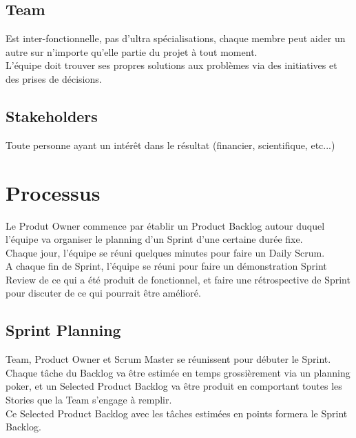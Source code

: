 \documentclass{report}
\begin{document}
		\subsection{Team}

			Est inter-fonctionnelle, pas d'ultra spécialisations, chaque membre peut aider un autre sur n'importe qu'elle partie du projet à tout moment.\\

			L'équipe doit trouver ses propres solutions aux problèmes via des initiatives et des prises de décisions.\\

		\subsection{Stakeholders}

			Toute personne ayant un intérêt dans le résultat (financier, scientifique, etc...)\\

	\section{Processus}

		Le Produt Owner commence par établir un Product Backlog autour duquel l'équipe va organiser le planning d'un Sprint d'une certaine durée fixe.\\

		Chaque jour, l'équipe se réuni quelques minutes pour faire un Daily Scrum.\\

		A chaque fin de Sprint, l'équipe se réuni pour faire un démonstration Sprint Review de ce qui a été produit de fonctionnel, et faire une rétrospective de Sprint pour discuter de ce qui pourrait être amélioré.\\

		\subsection{Sprint Planning}

			Team, Product Owner et Scrum Master se réunissent pour débuter le Sprint.\\
			Chaque tâche du Backlog va être estimée en temps grossièrement via un planning poker, et un Selected Product Backlog va être produit en comportant toutes les Stories que la Team s'engage à remplir.\\

			Ce Selected Product Backlog avec les tâches estimées en points formera le Sprint Backlog.\\
\end{document}
